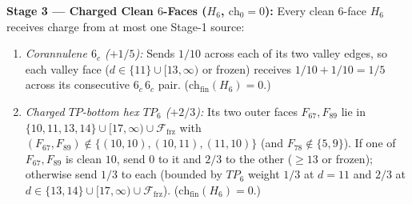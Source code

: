 \documentclass[11pt,reqno]{amsart}
\theoremstyle{plain}
\theoremstyle{definition}
\theoremstyle{remark}
\newcommand{\chz}{\mathrm{ch}_0}
\newcommand{\chf}{\mathrm{ch}_{\mathrm{fin}}}
\newcommand{\Ffrz}{\mathcal{F}_{\mathrm{frz}}}
\DeclareRobustCommand{\_}{\ifmmode\text{\textunderscore}\else\textunderscore\allowbreak\fi}
\begin{document}
\noindent\textbf{Stage 3 --- Charged Clean $6$-Faces ($H_6$, $\chz = 0$):}
Every clean $6$-face $H_6$ receives charge from at most one Stage-1 source:
\begin{enumerate}[label=(H\arabic*),leftmargin=2.8em]
  \item \emph{Corannulene $6_c$ ($+1/5$):} Sends $1/10$ across each of its two valley edges, so each valley face ($d \in \{11\} \cup [13, \infty)$ or frozen) receives $1/10 + 1/10 = 1/5$ across its consecutive $6_c\,6_c$ pair. ($\chf(H_6) = 0$.)
  \item \emph{Charged $TP$-bottom hex $TP_6$ ($+2/3$):} Its two outer faces $F_{67}, F_{89}$ lie in $\{10, 11, 13, 14\} \cup [17, \infty) \cup \Ffrz$ with $(F_{67}, F_{89}) \notin \{(10,10), (10,11), (11,10)\}$ (and $F_{78} \notin \{5, 9\}$). If one of $F_{67}, F_{89}$ is clean $10$, send $0$ to it and $2/3$ to the other ($\ge 13$ or frozen); otherwise send $1/3$ to each (bounded by $TP_6$ weight $1/3$ at $d=11$ and $2/3$ at $d \in \{13, 14\} \cup [17, \infty) \cup \Ffrz$). ($\chf(H_6) = 0$.)

\end{enumerate}
\end{document}

